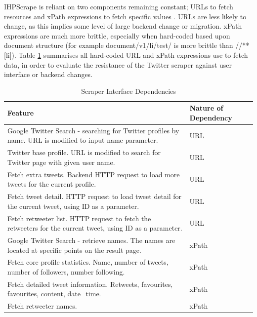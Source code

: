 
IHPScrape is reliant on two components remaining constant; URLs to fetch resources and xPath expressions to fetch specific values \cite{berglund2007xml}. URLs are less likely to change, as this implies some level of large backend change or migration. xPath expressions are much more brittle, especially when hard-coded based upon document structure (for example document/v1/li/test/ is more brittle than //**[li]). Table \ref{tab:interface_depend} summarises all hard-coded URL and xPath expressions use to fetch data, in order to evaluate the resistance of the Twitter scraper against user interface or backend changes.


\begin{table}[h!]
\begin{center}
  \begin{tabular}{| p{9cm} | l | }
  \hline
   \textbf{Feature} & \textbf{Nature of Dependency}  \\ \hline
   Google Twitter Search - searching for Twitter profiles by name. URL is modified to input name parameter. & URL \\ \hline
   Twitter base profile. URL is modified to search for Twitter page with given user name. & URL \\ \hline
   Fetch extra tweets. Backend HTTP request to load more tweets for the current profile. & URL  \\ \hline
   Fetch tweet detail. HTTP request to load tweet detail for the current tweet, using ID as a parameter.& URL \\ \hline
   Fetch retweeter list. HTTP request to fetch the retweeters for the current tweet, using ID as a parameter.& URL \\ \hline
   Google Twitter Search - retrieve names. The names are located at specific points on the result page.& xPath \\ \hline
   Fetch core profile statistics. Name, number of tweets, number of followers, number following.&  xPath \\ \hline
   Fetch detailed tweet information. Retweets, favourites, favourites, content, date\_time.&  xPath \\ \hline
   Fetch retweeter names. &xPath \\ \hline
  \end{tabular}  
\end{center}
\caption{Scraper Interface Dependencies}
\label{tab:interface_depend}
\end{table}

